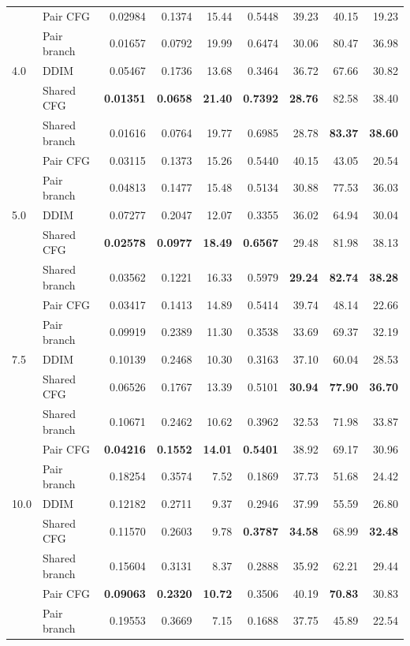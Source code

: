 \documentclass{article} %
\begin{document}
\begin{table}[t]
{\begin{tabular}{llrrrrrrr}
            & Pair CFG & 0.02984 & 0.1374 & 15.44 & 0.5448 & 39.23 & 40.15 & 19.23 \\
            & Pair branch & 0.01657 & 0.0792 & 19.99 & 0.6474 & 30.06 & 80.47 & 36.98 \\
        \midrule
        4.0 & DDIM & 0.05467 & 0.1736 & 13.68 & 0.3464 & 36.72 & 67.66 & 30.82 \\
            & Shared CFG & \textbf{0.01351} & \textbf{0.0658} & \textbf{21.40} & \textbf{0.7392} & \textbf{28.76} & 82.58 & 38.40 \\
            & Shared branch & 0.01616 & 0.0764 & 19.77 & 0.6985 & 28.78 & \textbf{83.37} & \textbf{38.60} \\
            & Pair CFG & 0.03115 & 0.1373 & 15.26 & 0.5440 & 40.15 & 43.05 & 20.54 \\
            & Pair branch & 0.04813 & 0.1477 & 15.48 & 0.5134 & 30.88 & 77.53 & 36.03 \\
        \midrule
        5.0 & DDIM & 0.07277 & 0.2047 & 12.07 & 0.3355 & 36.02 & 64.94 & 30.04 \\
            & Shared CFG & \textbf{0.02578} & \textbf{0.0977} & \textbf{18.49} & \textbf{0.6567} & 29.48 & 81.98 & 38.13 \\
            & Shared branch & 0.03562 & 0.1221 & 16.33 & 0.5979 & \textbf{29.24} & \textbf{82.74} & \textbf{38.28} \\
            & Pair CFG & 0.03417 & 0.1413 & 14.89 & 0.5414 & 39.74 & 48.14 & 22.66 \\
            & Pair branch & 0.09919 & 0.2389 & 11.30 & 0.3538 & 33.69 & 69.37 & 32.19 \\
        \midrule
        7.5 & DDIM & 0.10139 & 0.2468 & 10.30 & 0.3163 & 37.10 & 60.04 & 28.53 \\
            & Shared CFG & 0.06526 & 0.1767 & 13.39 & 0.5101 & \textbf{30.94} & \textbf{77.90} & \textbf{36.70} \\
            & Shared branch & 0.10671 & 0.2462 & 10.62 & 0.3962 & 32.53 & 71.98 & 33.87 \\
            & Pair CFG & \textbf{0.04216} & \textbf{0.1552} & \textbf{14.01} & \textbf{0.5401} & 38.92 & 69.17 & 30.96 \\
            & Pair branch & 0.18254 & 0.3574 & 7.52 & 0.1869 & 37.73 & 51.68 & 24.42 \\
        \midrule
        10.0 & DDIM & 0.12182 & 0.2711 & 9.37 & 0.2946 & 37.99 & 55.59 & 26.80 \\
             & Shared CFG & 0.11570 & 0.2603 & 9.78 & \textbf{0.3787} & \textbf{34.58} & 68.99 & \textbf{32.48} \\
             & Shared branch & 0.15604 & 0.3131 & 8.37 & 0.2888 & 35.92 & 62.21 & 29.44 \\
             & Pair CFG & \textbf{0.09063} & \textbf{0.2320} & \textbf{10.72} & 0.3506 & 40.19 & \textbf{70.83} & 30.83 \\
             & Pair branch & 0.19553 & 0.3669 & 7.15 & 0.1688 & 37.75 & 45.89 & 22.54 \\
        \bottomrule
    \end{tabular}}
\end{table}
\end{document}
